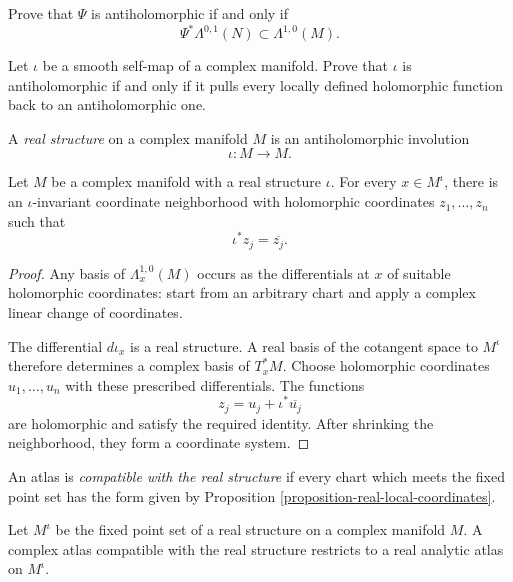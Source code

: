 \begin{exercise}
\label{exercise-antiholomorphic-pullback}
Prove that $\Psi$ is antiholomorphic if and
only if
$$
\Psi^*\Lambda^{0,1}(N)
\subset\Lambda^{1,0}(M).
$$
\end{exercise}

\begin{exercise}
\label{exercise-antiholomorphic-functions}
Let $\iota$ be a smooth self-map of a
complex manifold. Prove that $\iota$ is
antiholomorphic if and only if it pulls
every locally defined holomorphic function
back to an antiholomorphic one.
\end{exercise}

\begin{definition}
\label{definition-real-structure-manifold}
A {\it real structure} on a complex
manifold $M$ is an antiholomorphic
involution
$$
\iota:M\longrightarrow M.
$$
\end{definition}

\begin{proposition}
\label{proposition-real-local-coordinates}
Let $M$ be a complex manifold with a real
structure $\iota$. For every
$x\in M^\iota$, there is an
$\iota$-invariant coordinate neighborhood
with holomorphic coordinates
$z_1,\ldots,z_n$ such that
$$
\iota^*z_j=\overline{z_j}.
$$
\end{proposition}

\begin{proof}
Any basis of $\Lambda_x^{1,0}(M)$ occurs as
the differentials at $x$ of suitable
holomorphic coordinates: start from an
arbitrary chart and apply a complex linear
change of coordinates.

The differential $d\iota_x$ is a real
structure. A real basis of the cotangent
space to $M^\iota$ therefore determines a
complex basis of $T_x^*M$. Choose
holomorphic coordinates $u_1,\ldots,u_n$
with these prescribed differentials. The
functions
$$
z_j=u_j+\iota^*\overline{u_j}
$$
are holomorphic and satisfy the required
identity. After shrinking the neighborhood,
they form a coordinate system.
\end{proof}

\begin{definition}
\label{definition-compatible-real-atlas}
An atlas is {\it compatible with the real
structure} if every chart which meets the
fixed point set has the form given by
Proposition
\ref{proposition-real-local-coordinates}.
\end{definition}

\begin{proposition}
\label{proposition-fixed-real-analytic}
Let $M^\iota$ be the fixed point set of a
real structure on a complex manifold $M$.
A complex atlas compatible with the real
structure restricts to a real analytic
atlas on $M^\iota$.
\end{proposition}

